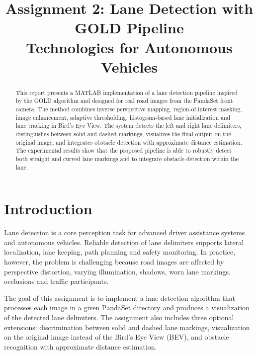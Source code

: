 \documentclass[conference]{IEEEtran}
\begin{document}
\pagestyle{plain}

\title{Assignment 2: Lane Detection with GOLD Pipeline \\ Technologies for Autonomous Vehicles}

\author{
}

\maketitle

\begin{abstract}
This report presents a MATLAB implementation of a lane detection pipeline inspired by the GOLD algorithm and designed for real road images from the PandaSet front camera. The method combines inverse perspective mapping, region-of-interest masking, image enhancement, adaptive thresholding, histogram-based lane initialization and lane tracking in Bird's Eye View. The system detects the left and right lane delimiters, distinguishes between solid and dashed markings, visualizes the final output on the original image, and integrates obstacle detection with approximate distance estimation. The experimental results show that the proposed pipeline is able to robustly detect both straight and curved lane markings and to integrate obstacle detection within the lane.
\end{abstract}

\section{Introduction}
Lane detection is a core perception task for advanced driver assistance systems and autonomous vehicles. Reliable detection of lane delimiters supports lateral localization, lane keeping, path planning and safety monitoring. In practice, however, the problem is challenging because road images are affected by perspective distortion, varying illumination, shadows, worn lane markings, occlusions and traffic participants.

The goal of this assignment is to implement a lane detection algorithm that processes each image in a given PandaSet directory and produces a visualization of the detected lane delimiters. The assignment also includes three optional extensions: discrimination between solid and dashed lane markings, visualization on the original image instead of the Bird's Eye View (BEV), and obstacle recognition with approximate distance estimation.
\end{document}
